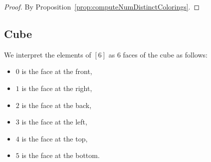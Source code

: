 \begin{proof}
  \leanok
  By Proposition~\ref{prop:computeNumDistinctColorings}.
\end{proof}

\subsection{Cube}

We interpret the elements of $[6]$ as $6$ faces of the cube as follows:
\begin{itemize}
  \item $0$ is the face at the front,

  \item $1$ is the face at the right,

  \item $2$ is the face at the back,

  \item $3$ is the face at the left,

  \item $4$ is the face at the top,

  \item $5$ is the face at the bottom.
\end{itemize}

